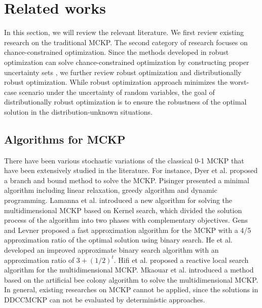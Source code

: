 \documentclass[lettersize,journal]{IEEEtran}
\begin{document}
\section{Related works}
\label{section:rw}
In this section, we will review the relevant literature. We first review existing research on the traditional MCKP. The second category of research focuses on chance-constrained optimization. Since the methods developed in robust optimization can solve chance-constrained optimization by constructing proper uncertainty sets \cite{han2016robust,joung2020robust}, we further review robust optimization and distributionally robust optimization. While robust optimization approach minimizes the worst-case scenario under the uncertainty of random variables, the goal of distributionally robust optimization is to ensure the robustness of the optimal solution in the distribution-unknown situations.

\subsection{Algorithms for MCKP}
There have been various stochastic variations of the classical 0-1 MCKP that have been extensively studied in the literature. 
For instance, Dyer et al.\cite{dyer1984branch} proposed a branch and bound method to solve the MCKP. 
Pisinger \cite{pisinger1995minimal} presented a minimal algorithm including linear relaxation, greedy algorithm and dynamic programming. 
Lamanna et al. \cite{lamanna2022two} introduced a new algorithm for solving the multidimensional MCKP based on Kernel search, which divided the solution process of the algorithm into two phases with complementary objectives. 
Gens and Levner \cite{gens1998approximate} proposed a fast approximation algorithm for the MCKP with a 4/5 approximation ratio of the optimal solution using binary search. 
He et al. \cite{he2016improved} developed an improved approximate binary search algorithm with an approximation ratio of $3+(1/2)^t$. 
Hifi et al. \cite{hifi2006reactive} proposed a reactive local search algorithm for the multidimensional MCKP. 
Mkaouar et al.  \cite{mkaouar2020solving} introduced a method based on the artificial bee colony algorithm to solve the multidimensional MCKP. 
In general, existing researches on MCKP cannot be applied, since the solutions in DDCCMCKP can not be evaluated by deterministic approaches.
\end{document}
